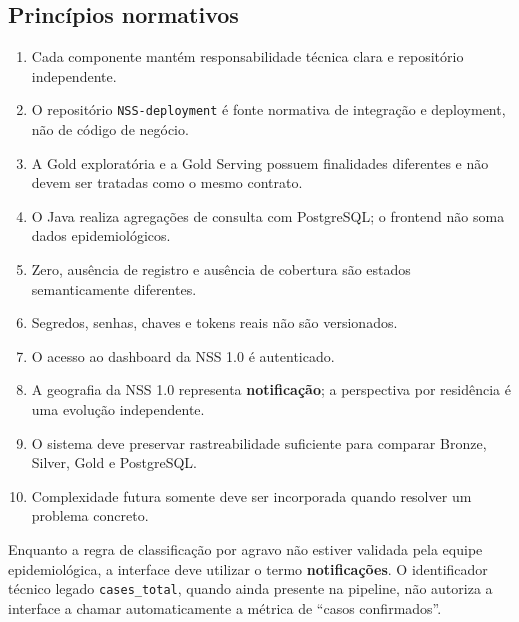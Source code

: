 \subsection{Princípios normativos}

\begin{enumerate}
    \item Cada componente mantém responsabilidade técnica clara e repositório independente.
    \item O repositório \texttt{NSS-deployment} é fonte normativa de integração e deployment, não de código de negócio.
    \item A Gold exploratória e a Gold Serving possuem finalidades diferentes e não devem ser tratadas como o mesmo contrato.
    \item O Java realiza agregações de consulta com PostgreSQL; o frontend não soma dados epidemiológicos.
    \item Zero, ausência de registro e ausência de cobertura são estados semanticamente diferentes.
    \item Segredos, senhas, chaves e tokens reais não são versionados.
    \item O acesso ao dashboard da NSS 1.0 é autenticado.
    \item A geografia da NSS 1.0 representa \textbf{notificação}; a perspectiva por residência é uma evolução independente.
    \item O sistema deve preservar rastreabilidade suficiente para comparar Bronze, Silver, Gold e PostgreSQL.
    \item Complexidade futura somente deve ser incorporada quando resolver um problema concreto.
\end{enumerate}

\begin{explicacao}
Enquanto a regra de classificação por agravo não estiver validada pela equipe epidemiológica, a interface deve utilizar o termo \textbf{notificações}. O identificador técnico legado \texttt{cases\_total}, quando ainda presente na pipeline, não autoriza a interface a chamar automaticamente a métrica de ``casos confirmados''.
\end{explicacao}
